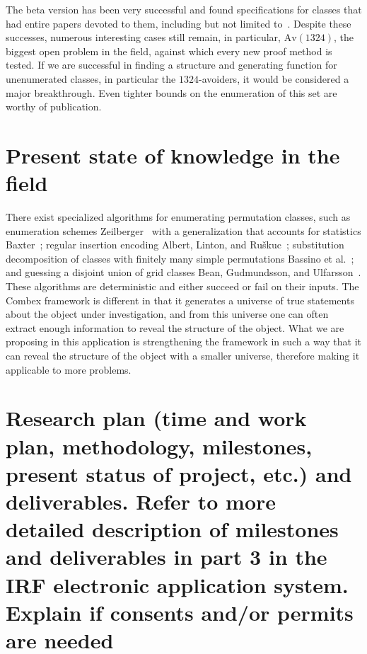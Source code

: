 \documentclass{rannis}
\newcommand{\motheralg}{\textsf{Combex}}
\newcommand{\Av}{\mathrm{Av}}
\theoremstyle{definition}
\begin{document}
The beta version has been very successful and found
specifications for classes that had entire papers devoted to them, including but
not limited to~\cite{inflationsofgridclasses, smoothclasses, le-wilfclasses,
dbis, jaysgridclasses}.
Despite these successes, numerous interesting cases still remain, in particular,
$\Av(1324)$, the biggest open problem in the field, against which every new
proof method is tested.
If we are successful in finding a structure
and generating function for unenumerated classes, in particular the
$1324$-avoiders, it would be considered a major breakthrough. Even tighter bounds
on the enumeration of this set are worthy of publication.
\\

\section{Present state of knowledge in the field}
There exist specialized algorithms for enumerating permutation classes, such as
enumeration schemes \mbox{Zeilberger}~\cite{MR1682929} with a generalization
that accounts for statistics \mbox{Baxter}~\cite{baxter2014scheme_statistics};
regular insertion encoding \mbox{Albert}, \mbox{Linton}, and \mbox{Ru\v{s}kuc}~\cite{MR2176523};
substitution decomposition of classes with finitely many simple permutations \mbox{Bassino}
et al.~\cite{subdecompimplement}; and
guessing a disjoint union of grid classes Bean, Gudmundsson, and Ulfarsson~\cite{algstruct, structpaper}.
These algorithms are deterministic and either succeed or fail on their inputs.
The \motheralg{} framework is different in that it generates a universe of true
statements about the object under investigation, and from this universe one can
often extract enough information to reveal the structure of the object. What we
are proposing in this application is strengthening the framework in such a way that
it can reveal the structure of the object with a smaller universe, therefore making
it applicable to more problems.
\\

\section{Research plan (time and work plan, methodology, milestones, present status of project, etc.) and deliverables. Refer to more detailed description of milestones and deliverables in part  3 in the IRF electronic application system. Explain if consents and/or permits are needed}
\end{document}
